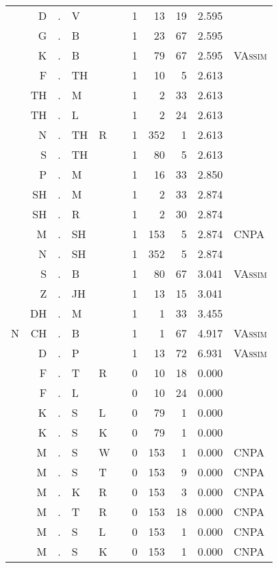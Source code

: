 \begin{longtable}{r@{ } r@{ } c@{ } l@{ } l@{ } l@{ } r r r r l }
  & D & . & V &   &   & 1 & 13 & 19 & 2.595 &  \\
  & G & . & B &   &   & 1 & 23 & 67 & 2.595 &  \\
  & K & . & B &   &   & 1 & 79 & 67 & 2.595 & \textsc{VAssim} \\
  & F & . & TH &   &   & 1 & 10 & 5 & 2.613 &  \\
  & TH & . & M &   &   & 1 & 2 & 33 & 2.613 &  \\
  & TH & . & L &   &   & 1 & 2 & 24 & 2.613 &  \\
  & N & . & TH & R &   & 1 & 352 & 1 & 2.613 &  \\
  & S & . & TH &   &   & 1 & 80 & 5 & 2.613 &  \\
  & P & . & M &   &   & 1 & 16 & 33 & 2.850 &  \\
  & SH & . & M &   &   & 1 & 2 & 33 & 2.874 &  \\
  & SH & . & R &   &   & 1 & 2 & 30 & 2.874 &  \\
  & M & . & SH &   &   & 1 & 153 & 5 & 2.874 & \textsc{CNPA} \\
  & N & . & SH &   &   & 1 & 352 & 5 & 2.874 &  \\
  & S & . & B &   &   & 1 & 80 & 67 & 3.041 & \textsc{VAssim} \\
  & Z & . & JH &   &   & 1 & 13 & 15 & 3.041 &  \\
  & DH & . & M &   &   & 1 & 1 & 33 & 3.455 &  \\
N & CH & . & B &   &   & 1 & 1 & 67 & 4.917 & \textsc{VAssim} \\
  & D & . & P &   &   & 1 & 13 & 72 & 6.931 & \textsc{VAssim} \\
  & F & . & T & R &   & 0 & 10 & 18 & 0.000 &  \\
  & F & . & L &   &   & 0 & 10 & 24 & 0.000 &  \\
  & K & . & S & L &   & 0 & 79 & 1 & 0.000 &  \\
  & K & . & S & K &   & 0 & 79 & 1 & 0.000 &  \\
  & M & . & S & W &   & 0 & 153 & 1 & 0.000 & \textsc{CNPA} \\
  & M & . & S & T &   & 0 & 153 & 9 & 0.000 & \textsc{CNPA} \\
  & M & . & K & R &   & 0 & 153 & 3 & 0.000 & \textsc{CNPA} \\
  & M & . & T & R &   & 0 & 153 & 18 & 0.000 & \textsc{CNPA} \\
  & M & . & S & L &   & 0 & 153 & 1 & 0.000 & \textsc{CNPA} \\
  & M & . & S & K &   & 0 & 153 & 1 & 0.000 & \textsc{CNPA} \\

\end{longtable}

